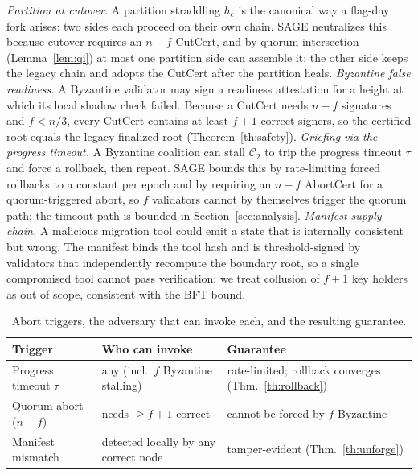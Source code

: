 \documentclass[journal]{IEEEtran}
\begin{document}
\emph{Partition at cutover.} A partition straddling $h_{\mathrm{c}}$ is the canonical way a
flag-day fork arises: two sides each proceed on their own chain. SAGE neutralizes this because
cutover requires an $n-f$ CutCert, and by quorum intersection (Lemma~\ref{lem:qi}) at most one
partition side can assemble it; the other side keeps the legacy chain and adopts the CutCert
after the partition heals. \emph{Byzantine false readiness.} A Byzantine validator may sign a
readiness attestation for a height at which its local shadow check failed. Because a CutCert
needs $n-f$ signatures and $f<n/3$, every CutCert contains at least $f+1$ correct signers, so
the certified root equals the legacy-finalized root (Theorem~\ref{th:safety}).
\emph{Griefing via the progress timeout.} A Byzantine coalition can stall $\mathcal{C}_2$ to
trip the progress timeout $\tau$ and force a rollback, then repeat. SAGE bounds this by
rate-limiting forced rollbacks to a constant per epoch and by requiring an $n-f$ AbortCert for
a quorum-triggered abort, so $f$ validators cannot by themselves trigger the quorum path; the
timeout path is bounded in Section~\ref{sec:analysis}. \emph{Manifest supply chain.} A
malicious migration tool could emit a state that is internally consistent but wrong. The
manifest binds the tool hash and is threshold-signed by validators that independently
recompute the boundary root, so a single compromised tool cannot pass verification; we treat
collusion of $f+1$ key holders as out of scope, consistent with the BFT bound.

\begin{table}[t]
\centering
\caption{Abort triggers, the adversary that can invoke each, and the resulting guarantee.}
\label{tab:abort}
\setlength{\tabcolsep}{4pt}
\renewcommand{\arraystretch}{1.2}
\footnotesize
\begin{tabular}{p{}p{}p{}}
\toprule
Trigger & Who can invoke & Guarantee \\
\midrule
Progress timeout $\tau$ & any (incl.\ $f$ Byzantine stalling) & rate-limited; rollback converges (Thm.~\ref{th:rollback}) \\
Quorum abort ($n{-}f$) & needs $\ge f{+}1$ correct & cannot be forced by $f$ Byzantine \\
Manifest mismatch & detected locally by any correct node & tamper-evident (Thm.~\ref{th:unforge}) \\
\bottomrule
\end{tabular}
\end{table}
\end{document}
